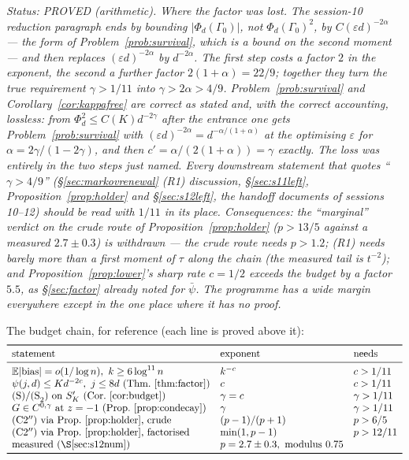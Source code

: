 \emph{Status: PROVED (arithmetic).  Where the factor was lost.  The
session-10 reduction paragraph ends by bounding $|\Phi_d(\Gamma_0)|$,
not $\Phi_d(\Gamma_0)^2$, by $C(\varepsilon d)^{-2\alpha}$ --- the
form of Problem~\ref{prob:survival}, which is a bound on the
\emph{second moment} --- and then replaces $(\varepsilon d)^{-2\alpha}$
by $d^{-2\alpha}$.  The first step costs a factor $2$ in the exponent,
the second a further factor $2(1+\alpha)=22/9$; together they turn
the true requirement $\gamma>1/11$ into $\gamma>2\alpha>4/9$.
Problem~\ref{prob:survival} and Corollary~\ref{cor:kappafree} are
correct as stated and, with the correct accounting, lossless: from
$\Phi_d^2\le C(K)d^{-2\gamma}$ after the entrance one gets
Problem~\ref{prob:survival} with
$(\varepsilon d)^{-2\alpha}=d^{-\alpha/(1+\alpha)}$ at the optimising
$\varepsilon$ for $\alpha=2\gamma/(1-2\gamma)$, and then
$c'=\alpha/(2(1+\alpha))=\gamma$ exactly.  The loss was entirely in
the two steps just named.  Every downstream statement that quotes
``$\gamma>4/9$'' (\S\ref{sec:markovrenewal} (R1) discussion,
\S\ref{sec:s11left}, Proposition~\ref{prop:holder} and
\S\ref{sec:s12left}, the handoff documents of sessions 10--12) should
be read with $1/11$ in its place.  Consequences: the ``marginal''
verdict on the crude route of Proposition~\ref{prop:holder}
($p>13/5$ against a measured $2.7\pm0.3$) is withdrawn --- the crude
route needs $p>1.2$; (R1) needs barely more than a first moment of
$\tau$ along the chain (the measured tail is $t^{-2}$); and
Proposition~\ref{prop:lower}'s sharp rate $c=1/2$ exceeds the budget
by a factor $5.5$, as \S\ref{sec:factor} already noted for
$\bar\psi$.  The programme has a wide margin everywhere except in
the one place where it has no proof.}

The budget chain, for reference (each line is proved above it):
\[
\begin{array}{lll}
\toprule
\text{statement} & \text{exponent} & \text{needs}\\
\midrule
\E|\mathrm{bias}|=o(1/\log n),\ k\ge6\log^{11}n & k^{-c} & c>1/11\\
\psi(j,d)\le Kd^{-2c},\ j\le8d\ \text{(Thm.~\ref{thm:factor})} & c & c>1/11\\
\text{(S)}/\text{(S}_2)\ \text{on }S'_K\ \text{(Cor.~\ref{cor:budget})} & \gamma=c & \gamma>1/11\\
G\in C^{0,\gamma}\ \text{at }z=-1\ \text{(Prop.~\ref{prop:condecay})} & \gamma & \gamma>1/11\\
\text{(C2$''$) via Prop.~\ref{prop:holder}, crude} & (p-1)/(p+1) & p>6/5\\
\text{(C2$''$) via Prop.~\ref{prop:holder}, factorised} & \min(1,p-1) & p>12/11\\
\text{measured (\S\ref{sec:s12num})} & p=2.7\pm0.3,\ \text{modulus }0.75 & \\
\bottomrule
\end{array}
\]

